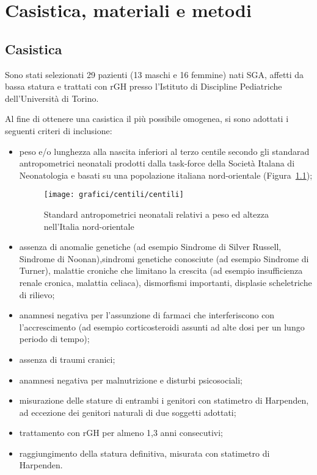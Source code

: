 \chapter{Casistica, materiali e metodi}

\section{Casistica}

Sono stati selezionati 29 pazienti (13 maschi e 16 femmine) nati SGA, affetti da bassa statura e trattati con rGH presso l'Istituto di Discipline Pediatriche dell'Università  di Torino.

Al fine di ottenere una casistica il più possibile omogenea, si sono adottati i seguenti criteri di inclusione:

\begin{itemize}
\item peso e/o lunghezza alla nascita inferiori al terzo centile secondo gli standarad antropometrici neonatali prodotti dalla task-force della Società Italana di Neonatologia e basati su una popolazione italiana nord-orientale (Figura~\ref{fig:StandardNeonataliNordOccidentali});
\begin{figure}[!h]
  \begin{center}
      \texttt{[image: grafici/centili/centili]} %
  \end{center}
  \caption{Standard antropometrici neonatali relativi a peso ed altezza nell'Italia nord-orientale}\cite{standard}
  \label{fig:StandardNeonataliNordOccidentali}
\end{figure}
\item assenza di anomalie genetiche (ad esempio Sindrome di Silver Russell, Sindrome di Noonan),sindromi genetiche conosciute (ad esempio Sindrome di Turner), malattie croniche che limitano la crescita (ad esempio insufficienza renale cronica, malattia celiaca), dismorfismi importanti, displasie scheletriche di rilievo;
 \item anamnesi negativa per l'assunzione di farmaci che interferiscono con l'accrescimento (ad esempio corticosteroidi assunti ad alte dosi per un lungo periodo di tempo);
 \item assenza di traumi cranici;
 \item anamnesi negativa per malnutrizione e disturbi psicosociali;
 \item misurazione delle stature di entrambi i genitori con statimetro di Harpenden, ad eccezione dei genitori naturali di due soggetti adottati;
\item trattamento con rGH per almeno 1,3 anni consecutivi;
\item raggiungimento della statura definitiva, misurata con statimetro di Harpenden. 
\end{itemize}

